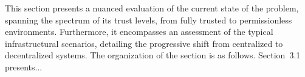 This section presents a nuanced evaluation of the current state of the \pol problem, spanning the spectrum of its trust levels, from fully trusted to permissionless environments. Furthermore, it encompasses an assessment of the typical infrastructural scenarios, detailing the progressive shift from centralized to decentralized systems. The organization of the section is as follows. Section~3.1 presents...